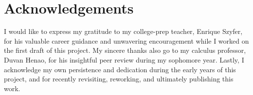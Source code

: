 \documentclass{article}
\begin{document}
	
	\section*{Acknowledgements}
	
	I would like to express my gratitude to my college-prep teacher, Enrique Szyfer, for his valuable career guidance and unwavering encouragement while I worked on the first draft of this project. My sincere thanks also go to my calculus professor, Duvan Henao, for his insightful peer review during my sophomore year. Lastly, I acknowledge my own persistence and dedication during the early years of this project, and for recently revisiting, reworking, and ultimately publishing this work.
	
	
	
	
	
	
	
\end{document}
